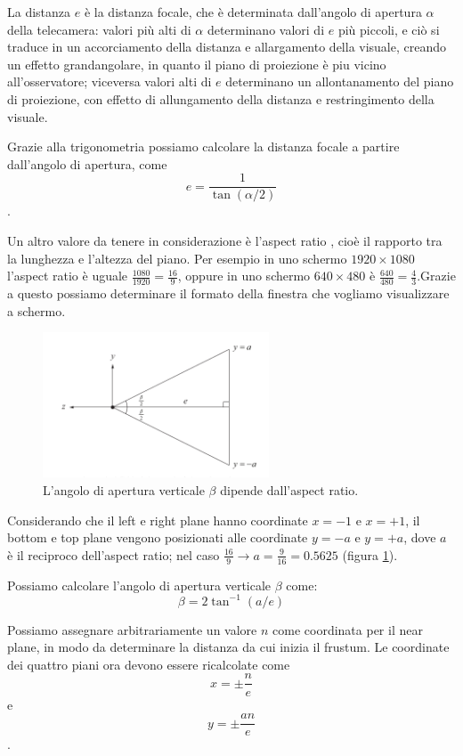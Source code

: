 La distanza $e$ è la distanza focale, che è determinata dall'angolo di apertura $\alpha$ della telecamera: valori più alti di $\alpha$ determinano valori di $e$ più piccoli, e ciò si traduce in un accorciamento della distanza e allargamento della visuale, creando un effetto grandangolare, in quanto il piano di proiezione è piu vicino all'osservatore; viceversa valori alti di $e$ determinano un allontanamento del piano di proiezione, con effetto di allungamento della distanza e restringimento della visuale.

Grazie alla trigonometria possiamo calcolare la distanza focale a partire dall'angolo di apertura, come  $$e = \frac{1}{\tan(\alpha/2)}$$.

Un altro valore da tenere in considerazione è l'aspect ratio , cioè il rapporto tra la lunghezza e l'altezza del piano. Per esempio in uno schermo $1920\times 1080$ l'aspect ratio è uguale $\frac{1080}{1920}=\frac{16}{9}$, oppure in uno schermo $640\times 480$ è $\frac{640}{480}=\frac{4}{3}$.Grazie a questo possiamo determinare il formato della finestra che vogliamo visualizzare a schermo.

\begin{figure}[htbp]
\centering
\includegraphics[width=0.6\textwidth]{images/frustum/frustum-y.png}
\caption{L'angolo di apertura verticale $\beta$ dipende dall'aspect ratio.\label{frustum-y}}
\end{figure}

Considerando che il left e right plane hanno coordinate $x=-1$ e $x=+1$, il bottom e top plane vengono posizionati alle coordinate $y=-a$ e $y=+a$, dove $a$ è il reciproco dell'aspect ratio; nel caso $\frac{16}{9} \rightarrow a=\frac{9}{16}=0.5625$ (figura \ref{frustum-y}).

Possiamo calcolare l'angolo di apertura verticale $\beta$ come: $$\beta=2\tan^{-1}(a/e)$$ 

Possiamo assegnare arbitrariamente un valore $n$ come coordinata per il near plane, in modo da determinare la distanza da cui inizia il frustum. Le coordinate dei quattro piani ora devono essere ricalcolate come $$x =\pm \frac{n}{e}$$ e $$y = \pm \frac{an}{e}$$.

